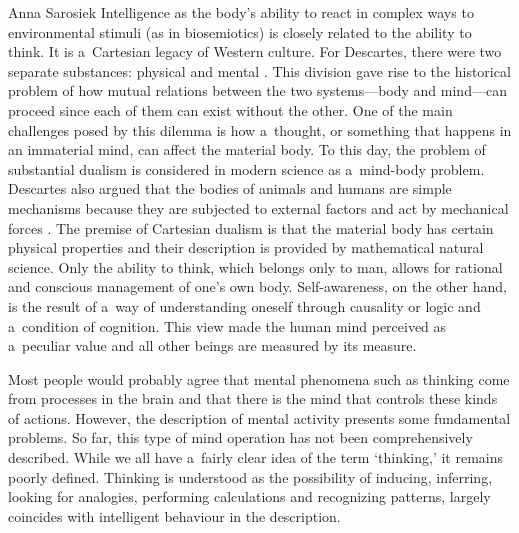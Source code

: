 \begin{artengenv}{Anna Sarosiek}
Intelligence as the body’s ability to react in complex ways to environmental stimuli (as in biosemiotics) is closely related to the ability to think. It is a~Cartesian legacy of Western culture. For Descartes, there were two separate substances: physical and mental
\parencite[][]{descartes_discours_1637}. %
 This division gave rise to the historical problem of how mutual relations between the two systems---body and mind---can proceed since each of them can exist without the other. One of the main challenges posed by this dilemma is how a~thought, or something that happens in an immaterial mind, can affect the material body. To this day, the problem of substantial dualism is considered in modern science as a~mind-body problem. Descartes also argued that the bodies of animals and humans are simple mechanisms because they are subjected to external factors and act by mechanical forces 
\parencite[][]{descartes_renati_1641}. %
 The premise of Cartesian dualism is that the material body has certain physical properties and their description is provided by mathematical natural science. Only the ability to think, which belongs only to man, allows for rational and conscious management of one's own body. Self-awareness, on the other hand, is the result of a~way of understanding oneself through causality or logic and a~condition of cognition. This view made the human mind perceived as a~peculiar value and all other beings are measured by its measure.

Most people would probably agree that mental phenomena such as thinking come from processes in the brain and that there is the mind that controls these kinds of actions. However, the description of mental activity presents some fundamental problems. So far, this type of mind operation has not been comprehensively described. While we all have a~fairly clear idea of the term ‘thinking,’ it remains poorly defined. Thinking is understood as the possibility of inducing, inferring, looking for analogies, performing calculations and recognizing patterns, largely coincides with intelligent behaviour in the description.


\end{artengenv}
